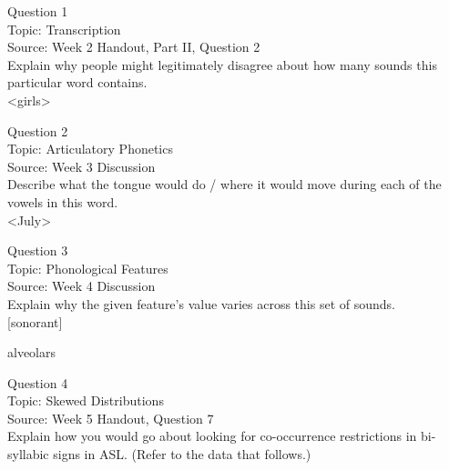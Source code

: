 \documentclass[12pt]{article}
\begin{document}
{\large Question 1}\\

Topic: Transcription\\
Source: Week 2 Handout, Part II, Question 2\\

Explain why people might legitimately disagree about how many sounds this particular word contains.\\

<girls>


\newpage

{\large Question 2}\\

Topic: Articulatory Phonetics\\
Source: Week 3 Discussion\\

Describe what the tongue would do / where it would move during each of the vowels in this word.\\

<July>


\newpage

{\large Question 3}\\

Topic: Phonological Features\\
Source: Week 4 Discussion\\

Explain why the given feature's value varies across this set of sounds.\\

{[sonorant]}

alveolars


\newpage

{\large Question 4}\\

Topic: Skewed Distributions\\
Source: Week 5 Handout, Question 7\\

Explain how you would go about looking for co-occurrence restrictions in bi-syllabic signs in ASL. (Refer to the data that follows.)\\
\end{document}
